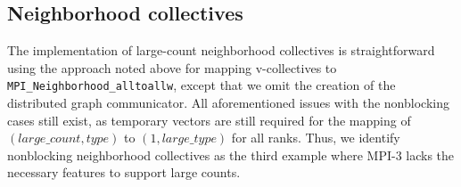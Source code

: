 
\subsection{Neighborhood collectives}


The implementation of large-count neighborhood collectives is straightforward
using the approach noted above for mapping v-collectives to \texttt{MPI\_Neighborhood\_alltoallw},
except that we omit the creation of the distributed graph communicator.
All aforementioned issues with the nonblocking cases still exist, as temporary vectors
are still required for the mapping of $(large\_count,type)$ to $(1,large\_type)$ for all ranks.
Thus, we identify nonblocking neighborhood collectives as the third example
where MPI-3 lacks the necessary features to support large counts.